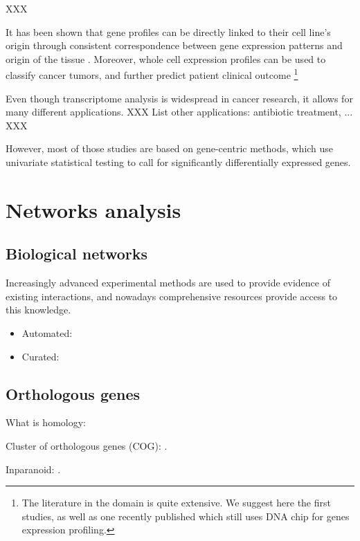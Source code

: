 	XXX

	It has been shown that gene profiles can be directly linked to their cell line's origin through consistent correspondence between gene expression patterns and origin of the tissue \parencite{ross2000systematic}.
	Moreover, whole cell expression profiles can be used to classify cancer tumors, and further predict patient clinical outcome \parencites{perou2000molecular}{sorlie2001gene}{vantveer2002gene}{vijver2002gene}{estevez2015gene}\footnote{The literature in the domain is quite extensive. We suggest here the first studies, as well as one recently published which still uses DNA chip for genes expression profiling.}

	Even though transcriptome analysis is widespread in cancer research, it allows for many different applications. XXX List other applications: antibiotic treatment, ... XXX

	However, most of those studies are based on gene-centric methods, which use univariate statistical testing to call for significantly differentially expressed genes.

\section{Networks analysis}

\subsection{Biological networks}

	Increasingly advanced experimental methods are used to provide evidence of existing interactions, and nowadays comprehensive resources provide access to this knowledge.

	\begin{itemize}
		\item Automated: \parencite{szklarczyk2014string}
		\item Curated: \parencite{orchard2012protein}
	\end{itemize}

	\subsection{Orthologous genes}
	\label{subsec:orthology}

	What is homology: \parencite{mccune2012using}

	Cluster of orthologous genes (COG): \parencite{tatusov1997genomic}.
	
	Inparanoid: \parencite{obrien2005inparanoid}.

